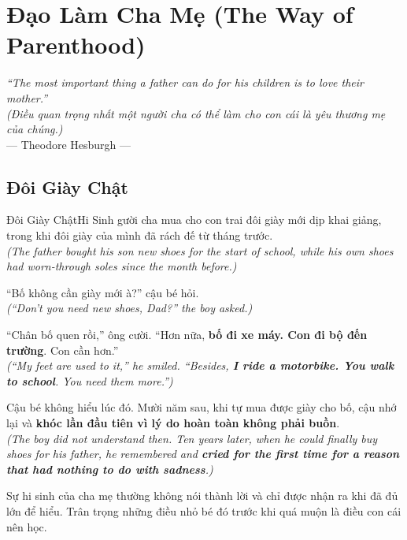\chapter{Đạo Làm Cha Mẹ (The Way of Parenthood)}

\begin{center}
  \textit{\color{truyenblue}``The most important thing a father can do for his children is to love their mother.''}\\
  \textit{(Điều quan trọng nhất một người cha có thể làm cho con cái là yêu thương mẹ của chúng.)}\\[4pt]
  \small\color{truyengold}--- Theodore Hesburgh ---
\end{center}
\ngancach

\section{Đôi Giày Chật}
\begin{truyen}{Đôi Giày Chật}{Hi Sinh}
gười cha mua cho con trai đôi giày mới dịp khai giảng, trong khi đôi giày của mình đã rách đế từ tháng trước.\\
\textit{(The father bought his son new shoes for the start of school, while his own shoes had worn-through soles since the month before.)}

``Bố không cần giày mới à?'' cậu bé hỏi.\\
\textit{(``Don't you need new shoes, Dad?'' the boy asked.)}

``Chân bố quen rồi,'' ông cười. ``Hơn nữa, \textbf{bố đi xe máy. Con đi bộ đến trường}. Con cần hơn.''\\
\textit{(``My feet are used to it,'' he smiled. ``Besides, \textbf{I ride a motorbike. You walk to school}. You need them more.'')}

Cậu bé không hiểu lúc đó. Mười năm sau, khi tự mua được giày cho bố, cậu nhớ lại và \textbf{khóc lần đầu tiên vì lý do hoàn toàn không phải buồn}.\\
\textit{(The boy did not understand then. Ten years later, when he could finally buy shoes for his father, he remembered and \textbf{cried for the first time for a reason that had nothing to do with sadness}.)}
\end{truyen}
\begin{baihoc}
  Sự hi sinh của cha mẹ thường không nói thành lời và chỉ được nhận ra khi đã đủ lớn để hiểu. Trân trọng những điều nhỏ bé đó trước khi quá muộn là điều con cái nên học.
\end{baihoc}


